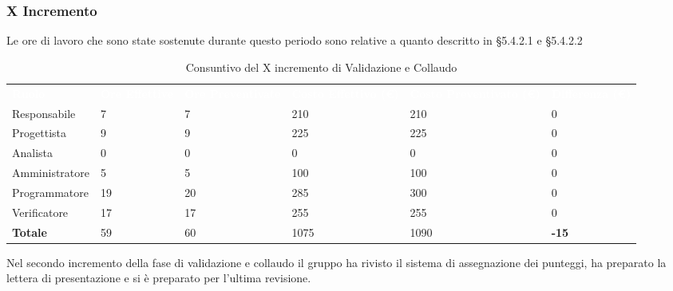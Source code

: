 \pagebreak

\subsubsection{X Incremento}
Le ore di lavoro che sono state sostenute durante questo periodo sono relative a quanto descritto in §5.4.2.1 e §5.4.2.2

\begin{table}[H]
\begin{center}
\renewcommand{\arraystretch}{1.5}
\begin{tabular}{ m{}<{\centering}  m{}<{\centering} m{}<{\centering} m{}<{\centering} m{}<{\centering} m{}<{\centering}}	\rowcolor{darkblue}
	\textcolor{white}{\textbf{Ruolo}} & \textcolor{white}{\textbf{Ore Effettive}} & \textcolor{white}{\textbf{Ore Preventivate}}&\textcolor{white}{\textbf{Costo Effettivo (\euro)}}&\textcolor{white}{\textbf{Costo Preventivato (\euro)}}&\textcolor{white}{\textbf{Differenza (\euro)}}\\ 

	Responsabile  & 7 & 7 & 210 & 210 & 0\\	
	
	Progettista & 9 & 9 & 225 & 225 & 0\\
	
	Analista & 0 & 0 & 0 & 0 & 0\\
	
	Amministratore & 5 & 5 & 100 & 100 & 0\\
	
	Programmatore & 19 & 20 & 285 & 300 & 0\\
	
	Verificatore & 17 & 17 & 255 & 255 & 0\\
	
	\textbf{Totale} & 59 & 60 & 1075 & 1090 & \textbf{-15} \\
	
\end{tabular}
\caption{Consuntivo del X incremento di Validazione e Collaudo}
\end{center}
\end{table}

Nel secondo incremento della fase di validazione e collaudo il gruppo ha rivisto il sistema di assegnazione dei punteggi, ha preparato la lettera di presentazione e si è preparato per l'ultima revisione.

